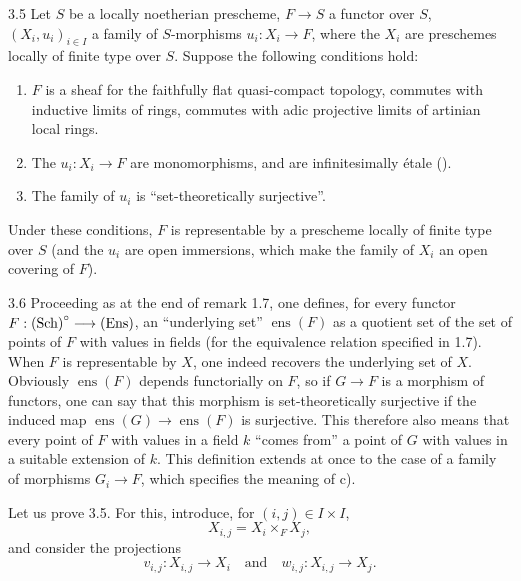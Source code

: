 \begin{proposition}{3.5}\label{XI.3.5}
Let $S$ be a locally noetherian prescheme, $F\to S$ a functor over $S$, $(X_i,u_i)_{i\in I}$ a family of $S$-morphisms $u_i:X_i\to F$, where the $X_i$ are preschemes locally of finite type over $S$. Suppose the following conditions hold:
\begin{enumerate}[label=\alph*)]
\item $F$ is a sheaf for the faithfully flat quasi-compact topology, commutes with inductive limits of rings, commutes with adic projective limits of artinian local rings.
\item The $u_i:X_i\to F$ are monomorphisms, and are infinitesimally étale ().
\item The family of $u_i$ is ``set-theoretically surjective''.
\end{enumerate}
Under these conditions, $F$ is representable by a prescheme locally of finite type over $S$ (and the $u_i$ are open immersions, which make the family of $X_i$ an open covering of $F$).
\end{proposition}
\begin{remark}{3.6}\label{XI.3.6}
Proceeding as at the end of remark 1.7, one defines, for every functor $F:\textup{(Sch)}^\circ\longrightarrow\textup{(Ens)}$, an ``underlying set'' $\operatorname{ens}(F)$ as a quotient set of the set of points of $F$ with values in fields (for the equivalence relation specified in 1.7). When $F$ is representable by $X$, one indeed recovers the underlying set of $X$. Obviously $\operatorname{ens}(F)$ depends functorially on $F$, so if $G\to F$ is a morphism of functors, one can say that this morphism is set-theoretically surjective if the induced map $\operatorname{ens}(G)\to\operatorname{ens}(F)$ is surjective. This therefore also means that every point of $F$ with values in a field $k$ ``comes from'' a point of $G$ with values in a suitable extension of $k$. This definition extends at once to the case of a family of morphisms $G_i\to F$, which specifies the meaning of c).
\end{remark}

Let us prove 3.5. For this, introduce, for $(i,j)\in I\times I$,
\[
X_{i,j}=X_i\times_F X_j,
\]
and consider the projections
\[
v_{i,j}:X_{i,j}\to X_i\quad\text{and}\quad w_{i,j}:X_{i,j}\to X_j.
\]
